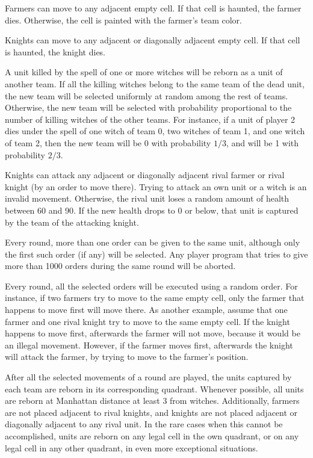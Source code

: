 \medskip Farmers can move to any adjacent empty cell. If that cell is
haunted, the farmer dies. Otherwise, the cell is painted with the
farmer's team color.

\medskip Knights can move to any adjacent or diagonally adjacent empty
cell. If that cell is haunted, the knight dies.

\medskip A unit killed by the spell of one or more witches
will be reborn as a unit of another team.
If all the killing witches belong to the same team of the dead unit,
the new team will be selected uniformly at random among the rest of teams.
Otherwise, the new team will be selected with probability proportional
to the number of killing witches of the other teams.
For instance, if a unit of player 2 dies under the spell
of one witch of team 0, two witches of team 1,
and one witch of team 2,
then the new team will be 0 with probability $1/3$,
and will be 1 with probability $2/3$.

\medskip Knights can attack any adjacent or diagonally adjacent
rival farmer or rival knight (by an order to move there).
Trying to attack an own unit or a witch
is an invalid movement. Otherwise, the rival unit loses a random amount
of health between 60 and 90. If the new health drops to 0 or below,
that unit is captured by the team of the attacking knight.

\medskip Every round, more than one order can be given to the same
unit, although only the first such order (if any) will be selected. Any
player program that tries to give more than 1000 orders during the same
round will be aborted.

\medskip Every round, all the selected orders will be executed using a
random order. For instance, if two farmers try to move to the same
empty cell, only the farmer that happens to move first will move there.
As another example, assume that one farmer and one rival knight
try to move to the same empty cell.
If the knight happens to move first,
afterwards the farmer will not move,
because it would be an illegal movement.
However, if the farmer moves first,
afterwards the knight will attack the farmer,
by trying to move to the farmer's position.

\medskip After all the selected movements of a round are played, the
units captured by each team are reborn in its corresponding quadrant.
Whenever possible, all units are reborn at Manhattan distance at least
3 from witches. Additionally, farmers are not placed adjacent to rival
knights, and knights are not placed adjacent or diagonally adjacent to
any rival unit. In the rare cases when this cannot be accomplished,
units are reborn on any legal cell in the own quadrant, or on any legal
cell in any other quadrant, in even more exceptional situations.

